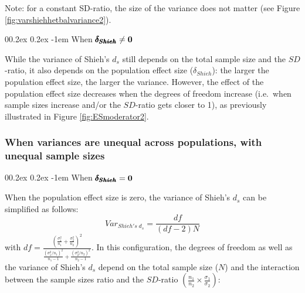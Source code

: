 \documentclass[
  english,
  man]{apa6}
\makeatletter
\let\oldparagraph\paragraph
\renewcommand{\paragraph}[1]{\oldparagraph{#1}\mbox{}}
\renewcommand{\paragraph}{\@startsection{paragraph}{4}{\parindent}%
  {0\baselineskip \@plus 0.2ex \@minus 0.2ex}%
  {-1em}%
  {\normalfont\normalsize\bfseries\itshape\typesectitle}}
\makeatother
\begin{document}
Note: for a constant SD-ratio, the size of the variance does not matter (see Figure \ref{fig:varshiehhetbalvariance2}).

\hypertarget{when-bf-pmbdelta_shieh-neq-0-1}{%
\paragraph{\texorpdfstring{When \(\bf \pmb{\delta_{Shieh}} \neq 0\)}{When \textbackslash bf \textbackslash pmb\{\textbackslash delta\_\{Shieh\}\} \textbackslash neq 0}}\label{when-bf-pmbdelta_shieh-neq-0-1}}

While the variance of Shieh's \(d_s\) still depends on the total sample size and the \(SD\)-ratio, it also depends on the population effect size (\(\delta_{Shieh}\)): the larger the population effect size, the larger the variance. However, the effect of the population effect size decreases when the degrees of freedom increase (i.e.~when sample sizes increase and/or the \(SD\)-ratio gets closer to 1), as previously illustrated in Figure \ref{fig:ESmoderator2}.

\hypertarget{when-variances-are-unequal-across-populations-with-unequal-sample-sizes-2}{%
\subsubsection{When variances are unequal across populations, with unequal sample sizes}\label{when-variances-are-unequal-across-populations-with-unequal-sample-sizes-2}}

\hypertarget{when-bf-pmbdelta_shieh0-2}{%
\paragraph{\texorpdfstring{When \(\bf \pmb{\delta_{Shieh}}=0\)}{When \textbackslash bf \textbackslash pmb\{\textbackslash delta\_\{Shieh\}\}=0}}\label{when-bf-pmbdelta_shieh0-2}}

When the population effect size is zero, the variance of Shieh's \(d_s\) can be simplified as follows:
\[Var_{Shieh's \; d_s} = \frac{df}{(df-2)N}\]
with \(df = \frac{\left(\frac{\sigma^2_1}{n_1}+\frac{\sigma^2_2}{n_2} \right)^2}{\frac{(\sigma^2_1/n_1)^2}{n_1-1}+\frac{(\sigma^2_2/n_2)^2}{n_2-1}}\). In this configuration, the degrees of freedom as well as the variance of Shieh's \(d_s\) depend on the total sample size (\(N\)) and the interaction between the sample sizes ratio and the \(SD\)-ratio \(\left(\frac{n_1}{n_2}\times\frac{\sigma_1}{\sigma_2} \right)\):
\end{document}
